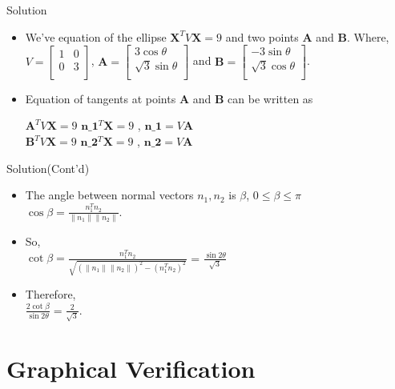 \documentclass{beamer}
\begin{document}
\begin{frame}{Solution}
  \begin{itemize}
\item<1->
We've equation of the ellipse $\textbf{X}^TV\textbf{X} = 9$ and two points \textbf{A} and \textbf{B}.
Where,
$V = \begin{bmatrix}
           1 & 0 \\
           0 & 3 \\
  \end{bmatrix}$, 
$\textbf{A}= \begin{bmatrix}
           3 \cos\theta\\
           \sqrt{3}\sin\theta \\
  \end{bmatrix}$
   and $\textbf{B}=\begin{bmatrix}
           -3 \sin\theta \\
           \sqrt{3}\cos\theta \\
  \end{bmatrix}$.
\item<2->
Equation of tangents at points \textbf{A} and \textbf{B} can be written as

$\textbf{A}^TV\textbf{X} = 9$ 
\implies $\textbf{{n}_1}^T\textbf{X} = 9$ 
, $\textbf{{n}_1} =V\textbf{A}$
\\
$\textbf{B}^TV\textbf{X} = 9$ 
\implies $\textbf{{n}_2}^T\textbf{X} = 9$ 
, $\textbf{{n}_2} =V\textbf{A}$
  \end{itemize}
\end{frame}

\begin{frame}{Solution(Cont'd)}
  \begin{itemize}
\item<1->
The angle between normal vectors ${{n}_1}, {{n}_2}$ is
$\beta$, $0\leq\beta\leq\pi$
\\
$\cos\beta = \frac{{n}_1^T{n}_2}{\|{n}_1\|\|{n}_2\|}$.
\item<2->
So,
\\
$\cot\beta = \frac{{n}_1^T{n}_2}{\sqrt{\left(\|{n}_1\|\|{n}_2\|\right)^2-\left({n}_1^T{n}_2\right)^2}}$
= $\frac{\sin2\theta}{\sqrt{3}}$
\item<3->
Therefore,
\\
$\frac{2\cot\beta}{\sin2\theta} = \frac{2}{\sqrt{3}}$.
\end{itemize}
\end{frame}

\section{Graphical Verification}
\end{document}
